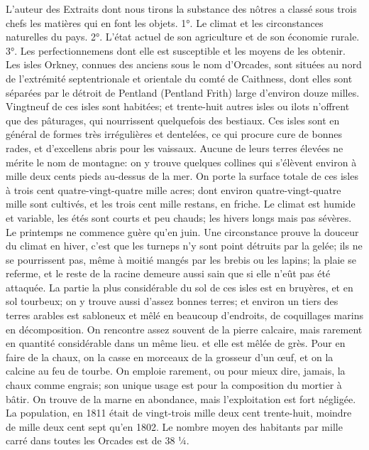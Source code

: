 L'auteur des Extraits dont nous tirons la substance des nôtres a classé sous trois chefs les matières qui en font les objets. 1°. Le climat et les circonstances naturelles du pays. 2°. L'état actuel de son agriculture et de son économie rurale. 3°. Les perfectionnemens dont elle est susceptible et les moyens de les obtenir.
Les isles Orkney, connues des anciens sous le nom d'Orcades, sont situées au nord de l'extrémité septentrionale et orientale du comté de Caithness, dont elles sont séparées par le détroit de Pentland (Pentland Frith) large d'environ douze milles. Vingtneuf de ces isles sont habitées; et trente-huit autres isles ou ilots n'offrent que des pâturages, qui nourrissent quelquefois des bestiaux. Ces isles sont en général de formes très irrégulières et dentelées, ce qui procure\setcounter{page}{389} cure de bonnes rades, et d'excellens abris pour les vaissaux. Aucune de leurs terres élevées ne mérite le nom de montagne: on y trouve quelques collines qui s'élèvent environ à mille deux cents pieds au-dessus de la mer. On porte la surface totale de ces isles à trois cent quatre-vingt-quatre mille acres; dont environ quatre-vingt-quatre mille sont cultivés, et les trois cent mille restans, en friche. Le climat est humide et variable, les étés sont courts et peu chauds; les hivers longs mais pas sévères. Le printemps ne commence guère qu'en juin. Une circonstance prouve la douceur du climat en hiver, c'est que les turneps n'y sont point détruits par la gelée; ils ne se pourrissent pas, même à moitié mangés par les brebis ou les lapins; la plaie se referme, et le reste de la racine demeure aussi sain que si elle n'eût pas été attaquée. La partie la plus considérable du sol de ces isles est en bruyères, et en sol tourbeux; on y trouve aussi d'assez bonnes terres; et environ un tiers des terres arables est sabloneux et mêlé en beaucoup d'endroits, de coquillages marins en décomposition. On rencontre assez souvent de la pierre calcaire, mais rarement en quantité considérable dans un même lieu.\setcounter{page}{390} et elle est mêlée de grès. Pour en faire de la chaux, on la casse en morceaux de la grosseur d'un œuf, et on la calcine au feu de tourbe. On emploie rarement, ou pour mieux dire, jamais, la chaux comme engrais; son unique usage est pour la composition du mortier à bâtir. On trouve de la marne en abondance, mais l'exploitation est fort négligée.
La population, en 1811 était de vingt-trois mille deux cent trente-huit, moindre de mille deux cent sept qu'en 1802. Le nombre moyen des habitants par mille carré dans toutes les Orcades est de 38 ¼.
